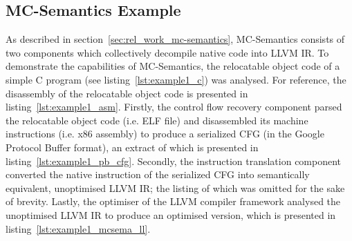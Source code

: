 
\subsection{MC-Semantics Example}
\label{app:mc-semantics_example}

As described in section~\ref{sec:rel_work_mc-semantics}, MC-Semantics consists of two components which collectively decompile native code into LLVM IR. To demonstrate the capabilities of MC-Semantics, the relocatable object code of a simple C program (see listing~\ref{lst:example1_c}) was analysed. For reference, the disassembly of the relocatable object code is presented in listing~\ref{lst:example1_asm}. Firstly, the control flow recovery component parsed the relocatable object code (i.e. ELF file) and disassembled its machine instructions (i.e. x86 assembly) to produce a serialized CFG (in the Google Protocol Buffer format), an extract of which is presented in listing~\ref{lst:example1_pb_cfg}. Secondly, the instruction translation component converted the native instruction of the serialized CFG into semantically equivalent, unoptimised LLVM IR; the listing of which was omitted for the sake of brevity. Lastly, the optimiser of the LLVM compiler framework analysed the unoptimised LLVM IR to produce an optimised version, which is presented in listing~\ref{lst:example1_mcsema_ll}.






